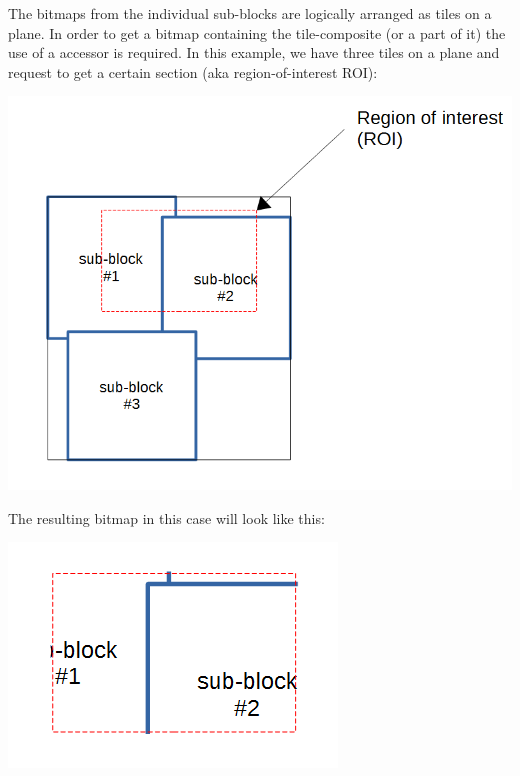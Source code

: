 The bitmaps from the individual sub-\/blocks are logically arranged as tiles on a plane. In order to get a bitmap containing the tile-\/composite (or a part of it) the use of a accessor is required. In this example, we have three tiles on a plane and request to get a certain section (aka region-\/of-\/interest R\+OI)\+:


\begin{DoxyImage}
\includegraphics[width=\textwidth,height=\textheight/2,keepaspectratio=true]{compositors_1.png}
\end{DoxyImage}
 The resulting bitmap in this case will look like this\+:


\begin{DoxyImage}
\includegraphics[width=\textwidth,height=\textheight/2,keepaspectratio=true]{compositors_2.png}
\end{DoxyImage}


